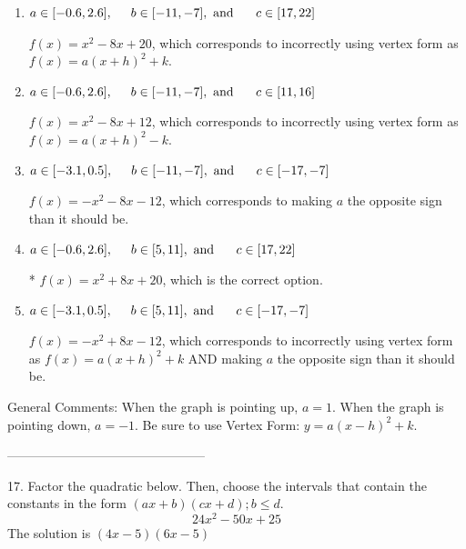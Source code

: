 \documentclass{article}[14pt]
\begin{document}
\begin{enumerate}[label=\Alph*.] 
\item $ a \in [-0.6, 2.6], \hspace*{5mm} b \in [-11, -7], \text{ and } \hspace*{5mm} c \in [17, 22] $ 

 $f(x)=x^{2} -8 x + 20$, which corresponds to incorrectly using vertex form as $f(x) = a(x+h)^2+k$. 
\item $ a \in [-0.6, 2.6], \hspace*{5mm} b \in [-11, -7], \text{ and } \hspace*{5mm} c \in [11, 16] $ 

 $f(x)=x^{2} -8 x + 12$, which corresponds to incorrectly using vertex form as $f(x) = a(x+h)^2 - k$. 
\item $ a \in [-3.1, 0.5], \hspace*{5mm} b \in [-11, -7], \text{ and } \hspace*{5mm} c \in [-17, -7] $ 

 $f(x)=-x^{2} -8 x -12$, which corresponds to making $a$ the opposite sign than it should be. 
\item $ a \in [-0.6, 2.6], \hspace*{5mm} b \in [5, 11], \text{ and } \hspace*{5mm} c \in [17, 22] $ 

 * $f(x)=x^{2} +8 x + 20$, which is the correct option. 
\item $ a \in [-3.1, 0.5], \hspace*{5mm} b \in [5, 11], \text{ and } \hspace*{5mm} c \in [-17, -7] $ 

 $f(x)=-x^{2} +8 x -12$, which corresponds to incorrectly using vertex form as $f(x) = a(x+h)^2+k$ AND making $a$ the opposite sign than it should be. 
\end{enumerate} 
 
General Comments: When the graph is pointing up, $a=1$. When the graph is pointing down, $a=-1$. Be sure to use Vertex Form: $y = a(x-h)^2+k$.

-----------------------------------------------

17. Factor the quadratic below. Then, choose the intervals that contain the constants in the form $(ax+b)(cx+d); b \leq d.$
$$ 24x^{2} -50 x + 25 $$ 
The solution is $ (4x -5)(6x -5) $ 
\end{document}
